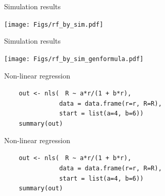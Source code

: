\documentclass[12pt]{article}
\newcommand{\headsize}{\fontsize{35}{35} \selectfont}
\newcommand{\textsize}{\fontsize{30}{35} \selectfont}
\begin{document}
{\headsize \color{myyellow}
\hfill \begin{minipage}{5.75in}
\centering
Simulation results
\end{minipage}

\vfill

\centerline{\texttt{[image: Figs/rf\_by\_sim.pdf]}}

\vspace{15mm}

\newpage

\addtocounter{page}{-1}

\headsize \color{myyellow}
\hfill \begin{minipage}{5.75in}
\centering
Simulation results
\end{minipage}

\vfill

\centerline{\texttt{[image: Figs/rf\_by\_sim\_genformula.pdf]}}

\vspace{15mm}

\newpage

\headsize \color{myyellow}
\hfill \begin{minipage}{5.75in}
\centering
Non-linear regression
\end{minipage}


\vspace{30mm}

\textsize
{\color{myblue}
\verb|    out <- nls(| {\tt \color{mypink} R \verb|~| a*r/(1 + b*r)}\verb|,| \\
\verb|               data = data.frame(r=r, R=R),| \\
\verb|               start = list(a=4, b=6))| \\
\verb|    summary(out)|
}

\newpage
\addtocounter{page}{-1}

\headsize \color{myyellow}
\hfill \begin{minipage}{5.75in}
\centering
Non-linear regression
\end{minipage}


\vspace{30mm}

\textsize
{\color{myblue}
\verb|    out <- nls(| {\tt \color{mypink} R \verb|~| a*r/(1 + b*r)}\verb|,| \\
\verb|               data = data.frame(r=r, R=R),| \\
\verb|               start = list(a=4, b=6))| \\
\verb|    summary(out)|
}

}
\end{document}
